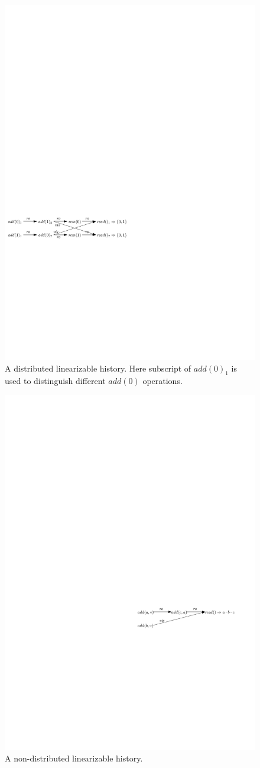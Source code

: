 {\begin{figure}[t]
  \centering
  \includegraphics[width=0.7 \textwidth]{figures/PIC-Example-LinHis.pdf}
  \caption{A distributed linearizable history. Here subscript of $\mathit{add}(0)_1$ is used to distinguish different $\mathit{add}(0)$ operations.}
  \label{fig:a distributed linearizable history}
\end{figure}



\begin{figure}[t]
  \centering
  \includegraphics[width=0.6 \textwidth]{figures/PIC-Example-NonLinHis.pdf}
  \caption{A non-distributed linearizable history.}
  \label{fig:a non-distributed linearizable history}
\end{figure}
}

